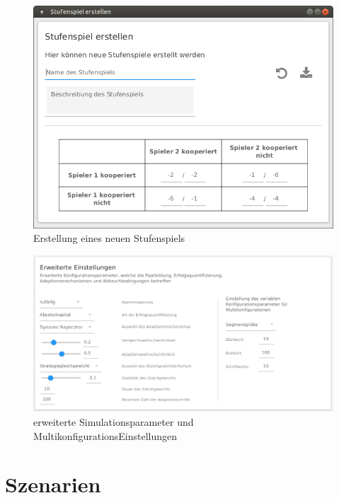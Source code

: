 \documentclass[parskip=full,11pt]{scrartcl}
\begin{document}
\begin{figure}[ht]
	\centering
	\includegraphics[width=\textwidth]{images/game.png}
	\caption{\label{fig:new_game}
		Erstellung eines neuen \Gls{Stufenspiel}s}
\end{figure}


\begin{figure}[hb]
	\centering
	\includegraphics[width=\textwidth]{images/konfig_adv.png}
	\caption{\label{fig:konfig_adv}
		erweiterte Simulationsparameter und MultikonfigurationsEinstellungen}
\end{figure}


\section{Szenarien}
\end{document}
